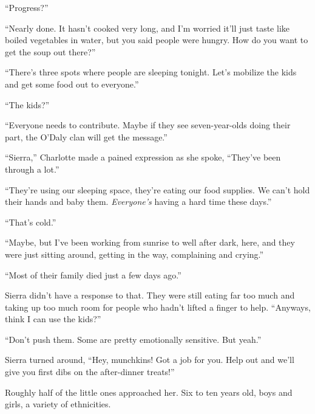 ``Progress?''



``Nearly done.  It hasn't cooked very long, and I'm worried it'll just taste like boiled vegetables in water, but you said people were hungry.  How do you want to get the soup out there?''



``There's three spots where people are sleeping tonight.  Let's mobilize the kids and get some food out to everyone.''



``The kids?''



``Everyone needs to contribute.  Maybe if they see seven-year-olds doing their part, the O'Daly clan will get the message.''



``Sierra,'' Charlotte made a pained expression as she spoke, ``They've been through a lot.''



``They're using our sleeping space, they're eating our food supplies.  We can't hold their hands and baby them.  \emph{Everyone's} having a hard time these days.''



``That's cold.''



``Maybe, but I've been working from sunrise to well after dark, here, and they were just sitting around, getting in the way, complaining and crying.''



``Most of their family died just a few days ago.''



Sierra didn't have a response to that.  They were still eating far too much and taking up too much room for people who hadn't lifted a finger to help.  ``Anyways, think I can use the kids?''



``Don't push them.  Some are pretty emotionally sensitive.  But yeah.''



Sierra turned around, ``Hey, munchkins!  Got a job for you.  Help out and we'll give you first dibs on the after-dinner treats!''



Roughly half of the little ones approached her.  Six to ten years old, boys and girls, a variety of ethnicities.



